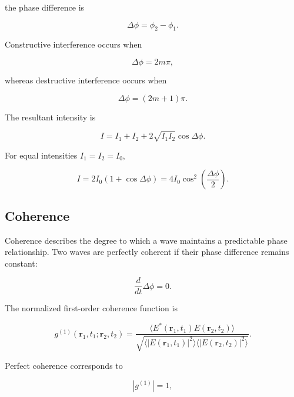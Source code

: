 \documentclass[12pt]{article}
\begin{document}
the phase difference is

\begin{equation}
\Delta\phi=\phi_2-\phi_1.
\end{equation}

Constructive interference occurs when

\begin{equation}
\Delta\phi=2m\pi,
\end{equation}

whereas destructive interference occurs when

\begin{equation}
\Delta\phi=(2m+1)\pi.
\end{equation}

The resultant intensity is

\begin{equation}
\boxed{
I=I_1+I_2+2\sqrt{I_1I_2}\cos\Delta\phi
}.
\end{equation}

For equal intensities $I_1=I_2=I_0$,

\begin{equation}
I=2I_0(1+\cos\Delta\phi)
=4I_0\cos^2\left(\frac{\Delta\phi}{2}\right).
\end{equation}

\subsection{Coherence}

Coherence describes the degree to which a wave maintains a predictable phase relationship. Two waves are perfectly coherent if their phase difference remains constant:

\begin{equation}
\frac{d}{dt}\Delta\phi=0.
\end{equation}

The normalized first-order coherence function is

\begin{equation}
g^{(1)}(\mathbf r_1,t_1;\mathbf r_2,t_2)
=
\frac{
\langle E^*(\mathbf r_1,t_1)E(\mathbf r_2,t_2)\rangle
}{
\sqrt{
\langle |E(\mathbf r_1,t_1)|^2\rangle
\langle |E(\mathbf r_2,t_2)|^2\rangle
}
}.
\end{equation}

Perfect coherence corresponds to

\begin{equation}
|g^{(1)}|=1,
\end{equation}
\end{document}
